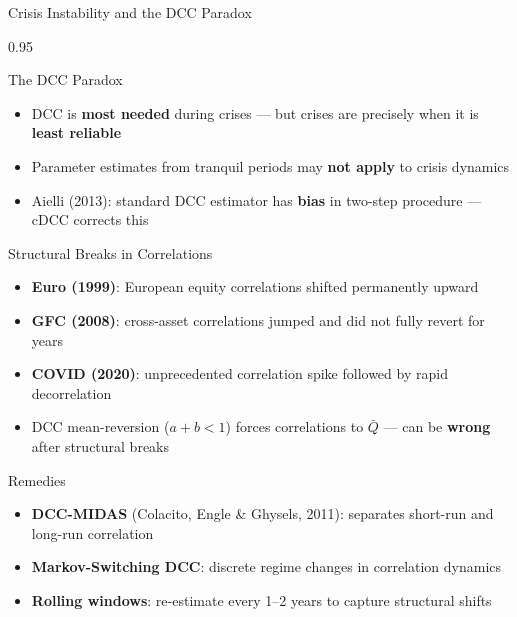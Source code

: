 \documentclass[9pt, aspectratio=169, t]{beamer}
\begin{document}
\begin{frame}{Crisis Instability and the DCC Paradox}
    \begin{cminipage}{0.95\textwidth}
    \vspace{-3mm}
    {\scriptsize
    \begin{block}{The DCC Paradox}
        \begin{itemize}\setlength{\itemsep}{0pt}
            \item DCC is \textbf{most needed} during crises --- but crises are precisely when it is \textbf{least reliable}
            \item Parameter estimates from tranquil periods may \textbf{not apply} to crisis dynamics
            \item Aielli (2013): standard DCC estimator has \textbf{bias} in two-step procedure --- cDCC corrects this
        \end{itemize}
    \end{block}
    \vspace{-2mm}
    \begin{block}{Structural Breaks in Correlations}
        \begin{itemize}\setlength{\itemsep}{0pt}
            \item \textbf{Euro (1999)}: European equity correlations shifted permanently upward
            \item \textbf{GFC (2008)}: cross-asset correlations jumped and did not fully revert for years
            \item \textbf{COVID (2020)}: unprecedented correlation spike followed by rapid decorrelation
            \item DCC mean-reversion ($a + b < 1$) forces correlations to $\bar{Q}$ --- can be \textbf{wrong} after structural breaks
        \end{itemize}
    \end{block}
    \vspace{-2mm}
    \begin{alertblock}{Remedies}
        \begin{itemize}\setlength{\itemsep}{0pt}
            \item \textbf{DCC-MIDAS} (Colacito, Engle \& Ghysels, 2011): separates short-run and long-run correlation
            \item \textbf{Markov-Switching DCC}: discrete regime changes in correlation dynamics
            \item \textbf{Rolling windows}: re-estimate every 1--2 years to capture structural shifts
        \end{itemize}
    \end{alertblock}
    }
    \end{cminipage}
\end{frame}
\end{document}
